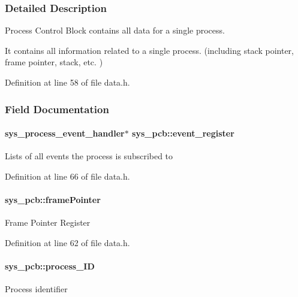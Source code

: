 \subsubsection{Detailed Description}
Process Control Block contains all data for a single process. 

It contains all information related to a single process. (including stack pointer, frame pointer, stack, etc. ) 

Definition at line 58 of file data.\+h.



\subsubsection{Field Documentation}
\hypertarget{structsys__pcb_afd9aeee04956909043bb0a7fe5915bcb}{}
\paragraph[{event\+\_\+register}]{\setlength{\rightskip}{0pt plus 5cm}sys\+\_\+process\+\_\+event\+\_\+handler$\ast$ sys\+\_\+pcb\+::event\+\_\+register}\label{structsys__pcb_afd9aeee04956909043bb0a7fe5915bcb}
Lists of all events the process is subscribed to 

Definition at line 66 of file data.\+h.

\hypertarget{structsys__pcb_a8f7cd57c4feb12f1fcda4f675e68f525}{}
\paragraph[{frame\+Pointer}]{ sys\+\_\+pcb\+::frame\+Pointer}\label{structsys__pcb_a8f7cd57c4feb12f1fcda4f675e68f525}
Frame Pointer Register 

Definition at line 62 of file data.\+h.

\hypertarget{structsys__pcb_a11351019f4ef27eedfdd0ce37c2295b7}{}
\paragraph[{process\+\_\+\+I\+D}]{ sys\+\_\+pcb\+::process\+\_\+\+I\+D}\label{structsys__pcb_a11351019f4ef27eedfdd0ce37c2295b7}
Process identifier 

